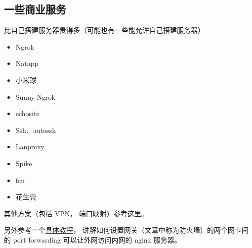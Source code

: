 \subsection{一些商业服务}
比自己搭建服务器贵得多（可能也有一些能允许自己搭建服务器）
\begin{itemize}
\item Ngrok
\item Natapp
\item 小米球
\item Sunny-Ngrok
\item echosite
\item Ssh、autossh
\item Lanproxy
\item Spike
\item fcn
\item 花生壳
\end{itemize}

其他方案（包括 VPN， 端口映射）参考\href{https://johackim.com/how-to-expose-local-server-behind-firewall}{这里}。

另外参考一个\href{https://www.digitalocean.com/community/tutorials/how-to-forward-ports-through-a-linux-gateway-with-iptables}{具体教程}， 讲解如何设置网关（文章中称为防火墙）的两个网卡间的 port forwarding 可以让外网访问内网的 nginx 服务器。 
